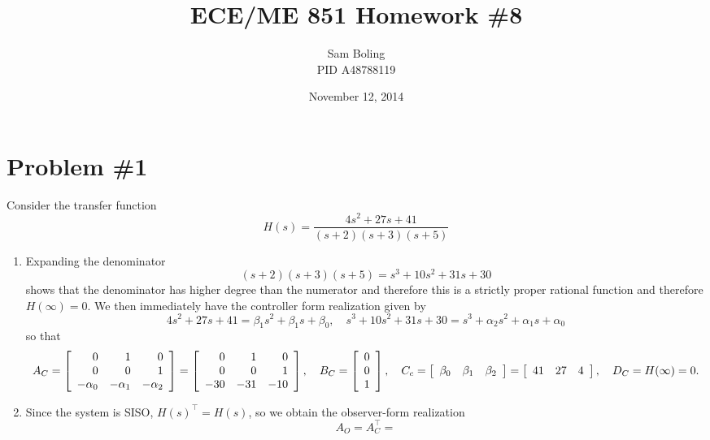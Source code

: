\documentclass{article}
\title{ECE/ME 851 Homework \#8}
\date{November 12, 2014}
\author{Sam Boling \\ PID A48788119}
\begin{document}
\maketitle

\section*{Problem \#1}
Consider the transfer function
$$
H(s) = \frac{4s^2 + 27s + 41}{(s+2)(s+3)(s+5)}
$$

\begin{enumerate}
  \item{
    Expanding the denominator
    $$
    (s+2)(s+3)(s+5) = s^3 + 10s^2 + 31s + 30
    $$
    shows that the denominator has higher degree than the numerator
    and therefore this is a strictly proper rational function and
    therefore $H(\infty) = 0$. We then immediately have the controller
    form realization given by
    $$
    4s^2 + 27s + 41 = \beta_{1} s^2 + \beta_{1} s + \beta_{0}, \quad
    s^3 + 10s^2 + 31s + 30 = s^3 + \alpha_{2} s^2 + \alpha_{1} s + \alpha_0
    $$
    so that
    $$
    A_C =
    \left[\begin{array}{r r r}
       0         & 1           & 0          \\
       0         & 0           & 1          \\
      -\alpha_{0} & -\alpha_{1} & -\alpha_{2}
    \end{array}\right] =
    \left[\begin{array}{r r r}
       0  & 1   & 0   \\
       0  & 0   & 1   \\
      -30 & -31 & -10
    \end{array}\right], \quad
    B_C =
    \left[\begin{array}{r r r}
       0 \\
       0 \\
       1
    \end{array}\right], \quad
    C_c =
    \left[\begin{array}{r r r}
      \beta_{0} & \beta_{1} & \beta_{2}
    \end{array}\right] =
    \left[\begin{array}{r r r}
      41 & 27 & 4
    \end{array}\right], \quad
    D_C = H(\infty) = 0.
    $$
  }
  \item{
    Since the system is SISO, $H(s)^\top = H(s)$, so we obtain the
    observer-form realization
    $$
    A_O = A_C^\top =
$$}
\end{enumerate}
\end{document}
